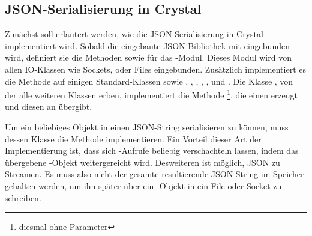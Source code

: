 \subsection{JSON-Serialisierung in Crystal}
\label{ssec:bj_json_serialisierung_in_crystal}

Zunächst soll erläutert werden, wie die JSON-Serialisierung in Crystal
implementiert wird.  Sobald die eingebaute JSON-Bibliothek mit  eingebunden wird, definiert sie die Methoden  sowie
 für das -Modul.  Dieses Modul wird von allen
IO-Klassen wie Sockets, oder Files eingebunden.  Zusätzlich implementiert es
die Methode  auf einigen Standard-Klassen sowie
, , , , ,
 und .  Die Klasse , von der alle weiteren
Klassen erben, implementiert die Methode \footnote{diesmal ohne
Parameter}, die einen  erzeugt und diesen an
 übergibt.

Um ein beliebiges Objekt in einen JSON-String serialisieren zu können, muss
dessen Klasse die Methode  implementieren.  Ein Vorteil
dieser Art der Implementierung ist, dass sich -Aufrufe
beliebig verschachteln lassen, indem das übergebene -Objekt
weitergereicht wird.  Desweiteren ist möglich, JSON zu Streamen.  Es muss also
nicht der gesamte resultierende JSON-String im Speicher gehalten werden, um ihn
später über ein -Objekt in ein File oder Socket zu schreiben.
